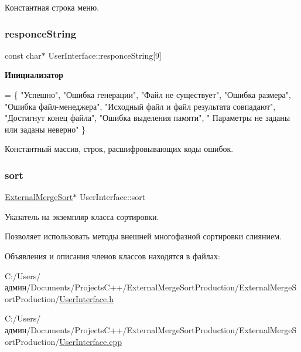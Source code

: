 Константная строка меню. 

\hypertarget{class_user_interface_a3ec4a2871150fd6b83ddf9d459aa0afc}{}\label{class_user_interface_a3ec4a2871150fd6b83ddf9d459aa0afc} 
\subsubsection{\texorpdfstring{responce\+String}{responceString}}
{\footnotesize\ttfamily const char$\ast$ User\+Interface\+::responce\+String\mbox{[}9\mbox{]}\hspace{0.3cm}{\ttfamily [private]}}

{\bfseries Инициализатор}
\begin{DoxyCode}
= \{ \textcolor{stringliteral}{"Успешно"}, \textcolor{stringliteral}{"Ошибка генерации"}, \textcolor{stringliteral}{"Файл не существует"}, \textcolor{stringliteral}{"Ошибка размера"}, \textcolor{stringliteral}{"Ошибка файл-менеджера"},
        \textcolor{stringliteral}{"Исходный файл и файл результата совпадают"}, \textcolor{stringliteral}{"Достигнут конец файла"}, \textcolor{stringliteral}{"Ошибка выделения памяти"}, \textcolor{stringliteral}{"
      Параметры не заданы или заданы неверно"} \}
\end{DoxyCode}


Константный массив, строк, расшифровывающих коды ошибок. 

\hypertarget{class_user_interface_af3405ffdb7e2834c2cf63662b5415a91}{}\label{class_user_interface_af3405ffdb7e2834c2cf63662b5415a91} 
\subsubsection{\texorpdfstring{sort}{sort}}
{\footnotesize\ttfamily \hyperlink{class_external_merge_sort}{External\+Merge\+Sort}$\ast$ User\+Interface\+::sort\hspace{0.3cm}{\ttfamily [private]}}



Указатель на экземпляр класса сортировки. 

Позволяет использовать методы внешней многофазной сортировки слиянием. 

Объявления и описания членов классов находятся в файлах\+:\begin{DoxyCompactItemize}
\item 
C\+:/\+Users/админ/\+Documents/\+Projects\+C++/\+External\+Merge\+Sort\+Production/\+External\+Merge\+Sort\+Production/\hyperlink{_user_interface_8h}{User\+Interface.\+h}\item 
C\+:/\+Users/админ/\+Documents/\+Projects\+C++/\+External\+Merge\+Sort\+Production/\+External\+Merge\+Sort\+Production/\hyperlink{_user_interface_8cpp}{User\+Interface.\+cpp}\end{DoxyCompactItemize}
